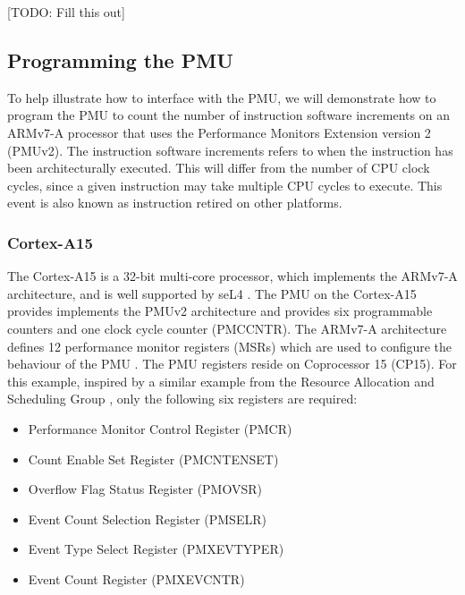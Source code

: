 {[TODO: Fill this out]

\subsection{Programming the PMU}\label{sect:programming_pmu}

To help illustrate how to interface with the PMU, we will demonstrate how to program the PMU to count the number of instruction software increments on an ARMv7-A processor that uses the Performance Monitors Extension version 2 (PMUv2). The instruction software increments refers to when the instruction has been architecturally executed. This will differ from the number of CPU clock cycles, since a given instruction may take multiple CPU cycles to execute. This event is also known as instruction retired on other platforms.

\subsubsection{Cortex-A15}

The Cortex-A15 is a 32-bit multi-core processor, which implements the ARMv7-A architecture, and is well supported by seL4 \cite{DocsSeL4Hardware}. The PMU on the Cortex-A15 provides implements the PMUv2 architecture and provides six programmable counters \cite{DocsArmCortexA15PMU} and one clock cycle counter (PMCCNTR). The ARMv7-A architecture defines 12 performance monitor registers (MSRs) which are used to configure the behaviour of the PMU \cite{DocsArmv7PMURegs}. The PMU registers reside on Coprocessor 15 (CP15). For this example, inspired by a similar example from the Resource Allocation and Scheduling Group \cite{TutHowToUsePMU}, only the following six registers are required:

\ssp

\begin{itemize}
    \item Performance Monitor Control Register (PMCR)
    \item Count Enable Set Register (PMCNTENSET)
    \item Overflow Flag Status Register (PMOVSR)
    \item Event Count Selection Register (PMSELR)
    \item Event Type Select Register (PMXEVTYPER)
    \item Event Count Register (PMXEVCNTR)
\end{itemize}

\dsp

}
